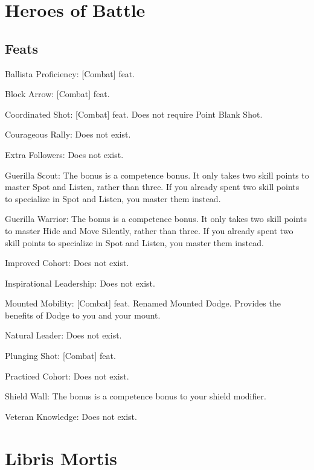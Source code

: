 \section{Heroes of Battle}
\subsection{Feats}
\begin{itemize*}
\item Ballista Proficiency: [Combat] feat.
\item Block Arrow: [Combat] feat.
\item Coordinated Shot: [Combat] feat. Does not require Point Blank Shot.
\item Courageous Rally: Does not exist.
\item Extra Followers: Does not exist.
\item Guerilla Scout: The bonus is a competence bonus. It only takes two skill points to master Spot and Listen, rather than three. If you already spent two skill points to specialize in Spot and Listen, you master them instead.
\item Guerilla Warrior: The bonus is a competence bonus. It only takes two skill points to master Hide and Move Silently, rather than three. If you already spent two skill points to specialize in Spot and Listen, you master them instead.
\item Improved Cohort: Does not exist.
\item Inspirational Leadership: Does not exist.
\item Mounted Mobility: [Combat] feat. Renamed Mounted Dodge. Provides the benefits of Dodge to you and your mount.
\item Natural Leader: Does not exist.
\item Plunging Shot: [Combat] feat.
\item Practiced Cohort: Does not exist.
\item Shield Wall: The bonus is a competence bonus to your shield modifier.
\item Veteran Knowledge: Does not exist.
\end{itemize*}

\section{Libris Mortis}
